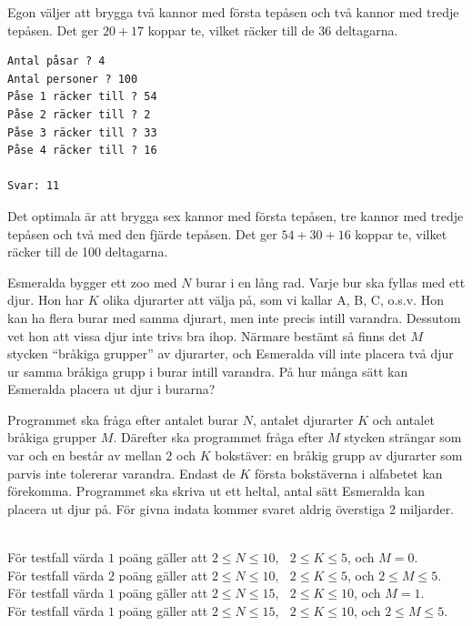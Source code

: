  Egon väljer att brygga två kannor med första tepåsen 
och två kannor med tredje tepåsen. Det ger $20+17$ koppar te, vilket
räcker till de 36 deltagarna.

\vspace{1cm}

\begin{verbatim}
Antal påsar ? 4
Antal personer ? 100
Påse 1 räcker till ? 54
Påse 2 räcker till ? 2
Påse 3 räcker till ? 33
Påse 4 räcker till ? 16

Svar: 11
\end{verbatim}


 Det optimala är att brygga sex kannor med första tepåsen,
tre kannor med tredje tepåsen och två med den fjärde tepåsen.
Det ger $54+30+16$ koppar te, vilket räcker till de 100  deltagarna.


\newpage
{}

Esmeralda bygger ett zoo med $N$ burar i en lång rad. Varje bur ska fyllas med ett djur. Hon har $K$ olika djurarter att välja på, som vi kallar A, B, C, o.s.v. Hon kan ha flera burar med samma djurart, men inte precis intill varandra. Dessutom vet hon att vissa djur inte trivs bra ihop. Närmare bestämt så finns det $M$ stycken ``bråkiga grupper'' av djurarter, och Esmeralda vill inte placera två djur ur samma bråkiga grupp i burar intill varandra. På hur många sätt kan Esmeralda placera ut djur i burarna?

Programmet ska fråga efter antalet burar $N$, antalet djurarter $K$ och antalet bråkiga grupper $M$. Därefter ska programmet fråga efter $M$ stycken strängar som var och en består av mellan $2$ och $K$ bokstäver: en bråkig grupp av djurarter som parvis inte tolererar varandra. Endast de $K$ första bokstäverna i alfabetet kan förekomma. Programmet ska skriva ut ett heltal, antal sätt Esmeralda kan placera ut djur på. För givna indata kommer svaret aldrig överstiga 2 miljarder.

\\
För testfall värda $1$ poäng gäller att $2\le N \le 10$, $\;\;2\le K \le 5$, och $M=0$. \\
För testfall värda $2$ poäng gäller att $2\le N \le 10$, $\;\;2\le K \le 5$, och $2 \le M\le 5$. \\
För testfall värda $1$ poäng gäller att $2\le N \le 15$, $\;\;2\le K \le 10$, och $M=1$. \\
För testfall värda $1$ poäng gäller att $2\le N \le 15$, $\;\;2\le K \le 10$, och $2 \le M\le 5$. \\


